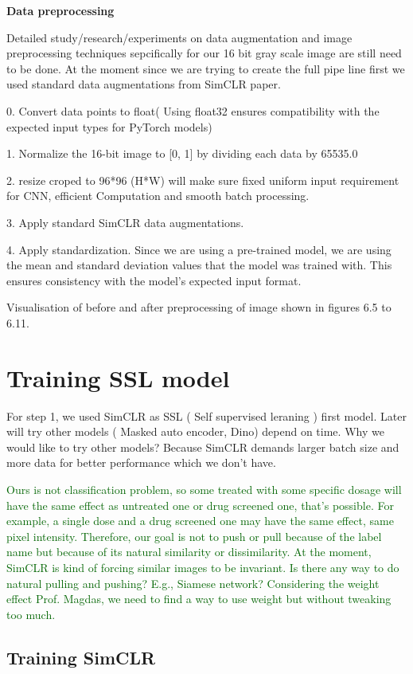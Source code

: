 \documentclass[12pt,twoside,a4paper,parskip]{scrbook} %
\begin{document}
\textbf{Data preprocessing}

Detailed study/research/experiments on data augmentation and image preprocessing techniques sepcifically for our 16 bit gray scale image are still need to be done.
At the moment since we are trying to create the full pipe line first we used standard data augmentations from SimCLR paper.

0. Convert data points to float( Using float32 ensures compatibility with the expected input types for PyTorch models) 

1. Normalize the 16-bit image to [0, 1] by dividing each data by 65535.0

2. resize croped to 96*96 (H*W) will make sure fixed uniform input requirement for CNN, efficient Computation and smooth batch processing.

3. Apply standard SimCLR data augmentations.

4. Apply standardization. Since we are using a pre-trained model, we are using the mean and standard deviation values that the model was trained with. This ensures consistency with the model's expected input format.

Visualisation of before and after preprocessing of image shown in figures 6.5 to 6.11.

\section{Training SSL model}

For step 1, we used SimCLR as SSL ( Self supervised leraning ) first model. Later will try other models ( Masked auto encoder, Dino) depend on time. 
Why we would like to try other models? Because SimCLR demands larger batch size and more data for better performance which we don't have.

\textcolor{darkgreen}{Ours is not classification problem, so some treated with some specific dosage will have the same effect as untreated one or drug screened one, that's possible. For example, a single dose and a drug screened one may have the same effect, same pixel intensity. Therefore, our goal is not to push or pull because of the label name but because of its natural similarity or dissimilarity. At the moment, SimCLR is kind of forcing similar images to be invariant. Is there any way to do natural pulling and pushing? E.g., Siamese network? Considering the weight effect Prof. Magdas, we need to find a way to use weight but without tweaking too much.}


\subsection{Training SimCLR}
\end{document}
